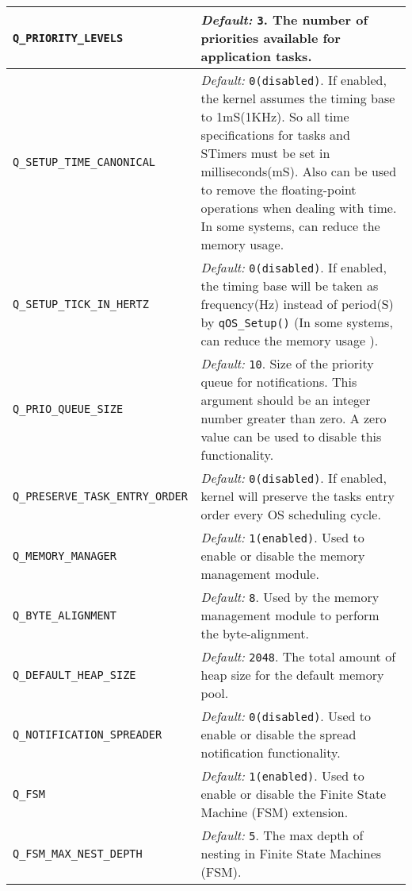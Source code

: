 \begin{adjustbox}{width=\textwidth,totalheight={18cm}}
\begin{tabularx}
{\textwidth}{l X}
\hline
{\lstinline!Q_PRIORITY_LEVELS!} & \textit{Default:} {\lstinline!3!}.  The number of priorities available for application tasks.\\
\hline
{\lstinline!Q_SETUP_TIME_CANONICAL!} & \textit{Default:}
{\lstinline!0(disabled)!}. If enabled, the kernel assumes the timing base to 1mS(1KHz). So all time specifications for tasks and STimers must be set in milliseconds(mS). Also can be used to remove the floating-point operations when dealing with time. In some systems, can reduce the memory usage. \\
\hline
{\lstinline!Q_SETUP_TICK_IN_HERTZ!} & \textit{Default:} {\lstinline!0(disabled)!}. If enabled, the timing base will be taken as frequency(Hz) instead of period(S) by {\lstinline!qOS_Setup()!} (In some systems, can reduce the memory usage ). \\
\hline
{\lstinline!Q_PRIO_QUEUE_SIZE!} & \textit{Default:} {\lstinline!10!}.  Size of the priority queue for notifications. This argument should be an integer number greater than zero. A zero value can be used to disable this functionality.\\
\hline
{\lstinline!Q_PRESERVE_TASK_ENTRY_ORDER !} & \textit{Default:} {\lstinline!0(disabled)!}. If enabled, kernel will preserve the tasks entry order every OS scheduling cycle.\\
\hline
{\lstinline!Q_MEMORY_MANAGER!} & \textit{Default:} {\lstinline!1(enabled)!}. Used to enable or disable the memory management module. \\
\hline
{\lstinline!Q_BYTE_ALIGNMENT!} & \textit{Default:} {\lstinline!8!}. Used by the memory management module to perform the byte-alignment. \\
\hline
{\lstinline!Q_DEFAULT_HEAP_SIZE!} & \textit{Default:} {\lstinline!2048!}. The total amount of heap size for the default memory pool. \\
\hline
{\lstinline!Q_NOTIFICATION_SPREADER!} & \textit{Default:} {\lstinline!0(disabled)!}. Used to enable or disable the spread notification functionality. \\
\hline
{\lstinline!Q_FSM!} & \textit{Default:} {\lstinline!1(enabled)!}.  Used to enable or disable the Finite State Machine (FSM) extension. \\
\hline
{\lstinline!Q_FSM_MAX_NEST_DEPTH!} & \textit{Default:} {\lstinline!5!}.  The max depth of nesting in Finite State Machines (FSM). \\

\end{tabularx}
\end{adjustbox}
